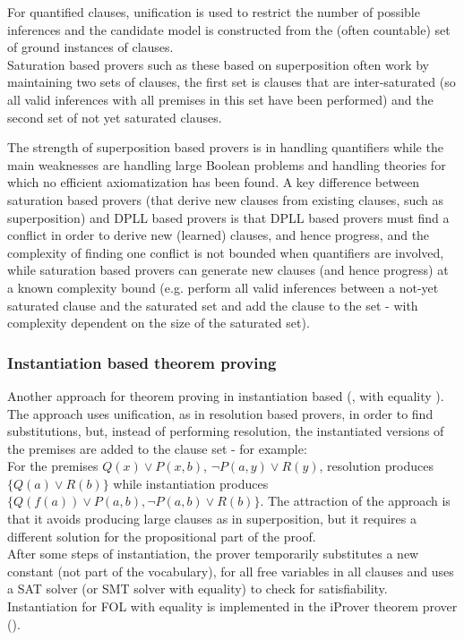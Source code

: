 For quantified clauses, unification is used to restrict the number of possible inferences and the candidate model is constructed from the (often countable) set of ground instances of clauses.\\
Saturation based provers such as these based on superposition often work by maintaining two sets of clauses, 
the first set is clauses that are inter-saturated (so all valid inferences with all premises in this set have been performed) and the second set of not yet saturated clauses.

The strength of superposition based provers is in handling quantifiers while the main weaknesses are handling large Boolean problems and handling theories for which no efficient axiomatization has been found. A key difference between saturation based provers (that derive new clauses from existing clauses, such as superposition) and DPLL based provers is that DPLL based provers must find a conflict in order to derive new (learned) clauses, and hence progress, and the complexity of finding one conflict is not bounded when quantifiers are involved, while saturation based provers can generate new clauses (and hence progress) at a known complexity bound (e.g. perform all valid inferences between a not-yet saturated clause and the saturated set and add the clause to the set - with complexity dependent on the size of the saturated set).

\subsubsection*{Instantiation based theorem proving}
Another approach for theorem proving in instantiation based (\cite{Korovin2008}, with equality \cite{DBLP:conf/cade/KorovinS10}).
The approach uses unification, as in resolution based provers, in order to find substitutions, but, instead of performing resolution, the instantiated versions of the premises are added to the clause set - for example:\\
For the premises $Q(x) \lor P(x,b)$, $\lnot P(a,y) \lor R(y)$, resolution produces $\{Q(a) \lor R(b)\}$ while instantiation produces $\{Q(f(a)) \lor P(a,b),\lnot P(a,b) \lor R(b)\}$. The attraction of the approach is that it avoids producing large clauses as in superposition, but it requires a different solution for the propositional part of the proof.\\
After some steps of instantiation, the prover temporarily substitutes a new constant (not part of the vocabulary), for all free variables in all clauses and uses a SAT solver (or SMT solver with equality) to check for satisfiability.
Instantiation for FOL with equality is implemented in the iProver theorem prover (\cite{DBLP:conf/cade/KorovinS10}).

